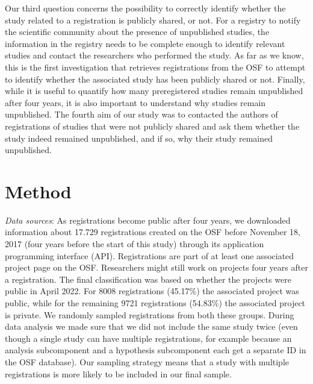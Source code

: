 \documentclass[
  ,jou, a4paper,floatsintext]{apa6}
\begin{document}
Our third question concerns the possibility to correctly identify whether the study related to a registration is publicly shared, or not. For a registry to notify the scientific community about the presence of unpublished studies, the information in the registry needs to be complete enough to identify relevant studies and contact the researchers who performed the study. As far as we know, this is the first investigation that retrieves registrations from the OSF to attempt to identify whether the associated study has been publicly shared or not.
Finally, while it is useful to quantify how many preregistered studies remain unpublished after four years, it is also important to understand why studies remain unpublished. The fourth aim of our study was to contacted the authors of registrations of studies that were not publicly shared and ask them whether the study indeed remained unpublished, and if so, why their study remained unpublished.

\hypertarget{method}{%
\section{Method}\label{method}}

\emph{Data sources}: As registrations become public after four years, we downloaded information about 17.729 registrations created on the OSF before November 18, 2017 (four years before the start of this study) through its application programming interface (API). Registrations are part of at least one associated project page on the OSF. Researchers might still work on projects four years after a registration. The final classification was based on whether the projects were public in April 2022. For 8008 registrations (45.17\%) the associated project was public, while for the remaining 9721 registrations (54.83\%) the associated project is private. We randomly sampled registrations from both these groups. During data analysis we made sure that we did not include the same study twice (even though a single study can have multiple registrations, for example because an analysis subcomponent and a hypothesis subcomponent each get a separate ID in the OSF database). Our sampling strategy means that a study with multiple registrations is more likely to be included in our final sample.
\end{document}
